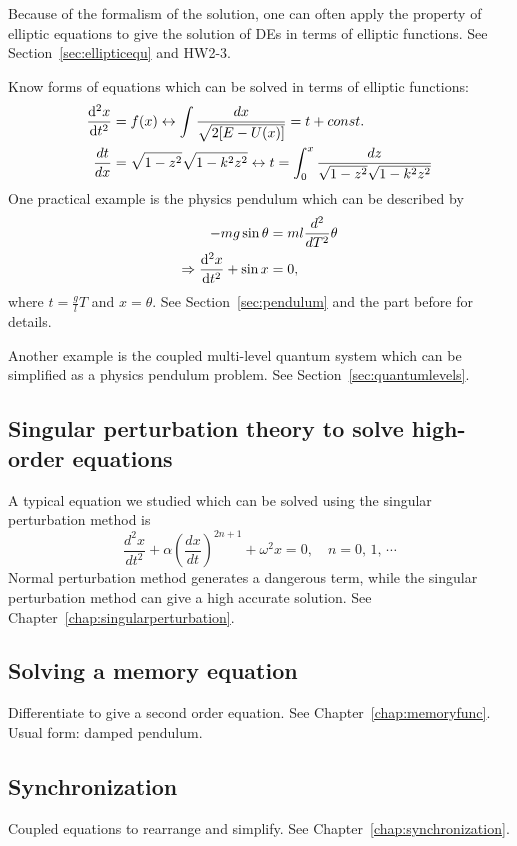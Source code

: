 Because of the formalism of the solution, one can often apply the property of elliptic equations to give the solution of DEs in terms of elliptic functions. See Section~\ref{sec:ellipticequ} and HW2-3. 

Know forms of equations which can be solved in terms of elliptic functions:
\begin{align}
\frac{{\mathrm d}^2 {x}}{{\mathrm d}t^2}&=f(x) \leftrightarrow \int{\frac{dx}{\sqrt{2[E-U(x)]}}}=t+const.\\
\frac{dt}{dx} &=\sqrt{1-z^2}\sqrt{1-k^2z^2} \leftrightarrow 
t=\int^x_0 \frac{dz}{\sqrt{1-z^2}\sqrt{1-k^2z^2}} \\
\end{align}
One practical example is the physics pendulum which can be described by
\begin{align}
-mg \sin{\theta} &=ml\frac{d^2}{dT^2}\theta\\
\Rightarrow
\frac{{\mathrm d}^2 {x}}{{\mathrm d}t^2}+\sin{x} &=0,
\end{align}
where  $ t=\frac{g}{l}T $ and $ x=\theta $. See Section~\ref{sec:pendulum} and the part before for details.

Another example is the coupled multi-level quantum system which can be simplified as a physics pendulum problem. See Section~\ref{sec:quantumlevels}.

\subsection{Singular perturbation theory to solve high-order equations}
A typical equation we studied which can be solved using the singular perturbation method is
\begin{equation}
\frac{d^2x}{dt^2}+ \alpha \left(\frac{dx}{dt}\right)^{2n+1} + \omega^2 x = 0,\quad n=0,\,1,\,\cdots 
\end{equation}
Normal perturbation method generates a dangerous term, while the singular perturbation method can give a high accurate solution. 
See Chapter~\ref{chap:singularperturbation}. 

\subsection{Solving a memory equation}
Differentiate to give a second order equation. See Chapter~\ref{chap:memoryfunc}. Usual form: damped pendulum. 

\subsection{Synchronization}
Coupled equations to rearrange and simplify. See Chapter~\ref{chap:synchronization}. 

